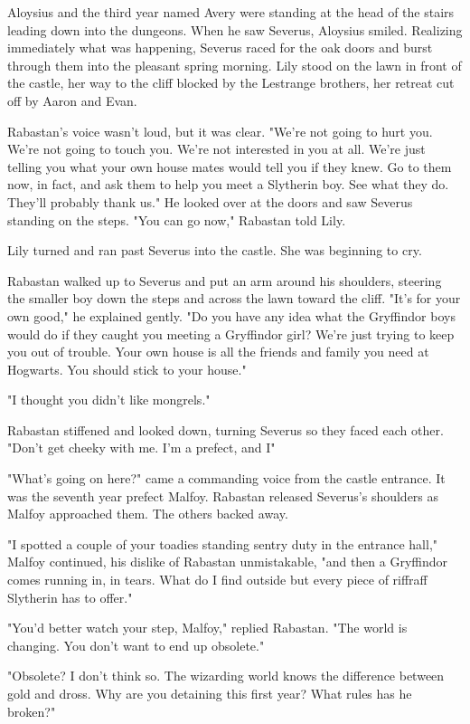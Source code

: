 Aloysius and the third year named Avery were standing at the head of the stairs leading down into the dungeons. When he saw Severus, Aloysius smiled. Realizing immediately what was happening, Severus raced for the oak doors and burst through them into the pleasant spring morning. Lily stood on the lawn in front of the castle, her way to the cliff blocked by the Lestrange brothers, her retreat cut off by Aaron and Evan.

Rabastan's voice wasn't loud, but it was clear. "We're not going to hurt you. We're not going to touch you. We're not interested in you at all. We're just telling you what your own house mates would tell you if they knew. Go to them now, in fact, and ask them to help you meet a Slytherin boy. See what they do. They'll probably thank us." He looked over at the doors and saw Severus standing on the steps. "You can go now," Rabastan told Lily.

Lily turned and ran past Severus into the castle. She was beginning to cry.

Rabastan walked up to Severus and put an arm around his shoulders, steering the smaller boy down the steps and across the lawn toward the cliff. "It's for your own good," he explained gently. "Do you have any idea what the Gryffindor boys would do if they caught you meeting a Gryffindor girl? We're just trying to keep you out of trouble. Your own house is all the friends and family you need at Hogwarts. You should stick to your house."

"I{\el} thought you{\el} didn't like{\el} mongrels."

Rabastan stiffened and looked down, turning Severus so they faced each other. "Don't get cheeky with me. I'm a prefect, and I{\el}"

"What's going on here?" came a commanding voice from the castle entrance. It was the seventh year prefect Malfoy. Rabastan released Severus's shoulders as Malfoy approached them. The others backed away.

"I spotted a couple of your toadies standing sentry duty in the entrance hall," Malfoy continued, his dislike of Rabastan unmistakable, "and then a Gryffindor comes running in, in tears. What do I find outside but every piece of riffraff Slytherin has to offer."

"You'd better watch your step, Malfoy," replied Rabastan. "The world is changing. You don't want to end up obsolete."

"Obsolete? I don't think so. The wizarding world knows the difference between gold and dross. Why are you detaining this first year? What rules has he broken?"

